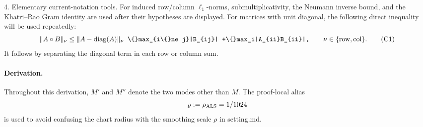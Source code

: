 4. Elementary current-notation tools. For induced row/column
   \(\ell_1\)-norms, submultiplicativity, the Neumann inverse bound, and the
   Khatri--Rao Gram identity are used after their hypotheses are displayed.
   For matrices with unit diagonal, the following direct inequality will be
   used repeatedly:
   \[
   \|A\circ B\|_\nu
   \le \|A-\operatorname{diag}(A)\|_\nu
\texttt{      \textbackslash\{\}max\_\{i\textbackslash\{\}ne j\}|B\_\{ij\}|}
\texttt{   +\textbackslash\{\}max\_i|A\_\{ii\}B\_\{ii\}|,}
   \qquad \nu\in\{{\rm row},{\rm col}\}.
   \tag{C1}
   \]
   It follows by separating the diagonal term in each row or column sum.

\paragraph{Derivation.}

Throughout this derivation, \(M'\) and \(M''\) denote the two modes other
than \(M\). The proof-local alias
\[
\varrho:=\rho_{\rm ALS}=1/1024
\]
is used to avoid confusing the chart radius with the smoothing scale
\(\rho\) in setting.md.


